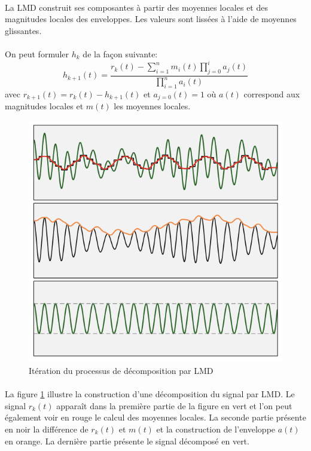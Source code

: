 \paragraph{}
La LMD construit ses composantes à partir des moyennes locales et des magnitudes locales des enveloppes. Les valeurs sont lissées à l'aide de moyennes glissantes.
\paragraph{}
On peut formuler $h_k$ de la façon suivante:
\begin{equation}
    h_{k+1}(t) = \frac{r_k(t) - \sum_{i=1}^{n}{m_i(t) \prod_{j=0}^{i}a_j(t) } }{\prod_{i=1}^{n}a_i(t)}
\end{equation}
avec $r_{k+1}(t)=r_k(t)-h_{k+1}(t)$ et $a_{j=0}(t) = 1$ où $a(t)$ correspond aux magnitudes locales et $m(t)$ les moyennes locales.
\begin{figure}[!h]
\begin{center} 
\includegraphics[scale=0.8]{rapport/images/Ch3_LMD.png} \end{center}
\caption{Itération du processus de décomposition par LMD \cite{NAM}}
\label{fig:LMD}
\end{figure}
\paragraph{}
La figure \ref{fig:LMD} illustre la construction d'une décomposition du signal par LMD. Le signal $r_k(t)$ apparaît dans la première partie de la figure en vert et l'on peut également voir en rouge le calcul des moyennes locales. La seconde partie présente en noir la différence de $r_k(t)$ et $m(t)$ et la construction de l'enveloppe $a(t)$ en orange. 
La dernière partie présente le signal décomposé en vert.
